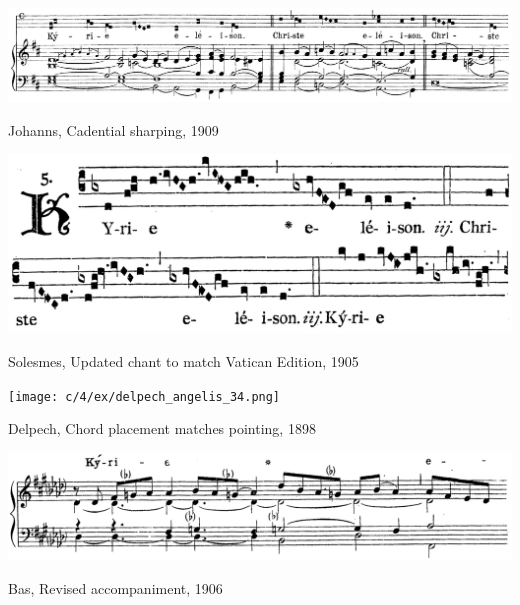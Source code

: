 \begin{landscape}

  \vspace*{\fill}

  \begin{example}
    \centering
    \includegraphics[width=.9\linewidth]{c/4/ex/johanns_50.png}
    \caption{Johanns, Cadential sharping, 1909}
    \label{mus:johanns_50}
  \end{example}

  \vspace*{\fill}

\end{landscape}

\vspace*{\fill}

\begin{example}
  \centering
  \includegraphics[width=.8\linewidth]{c/4/ex/solesmes_vatican_28star.png}
  \caption{Solesmes, Updated chant to match Vatican Edition, 1905}
  \label{mus:solesmes_vatican_28star}
\end{example}

\vspace*{\fill}

\begin{example}
  \centering
  \texttt{[image: c/4/ex/delpech\_angelis\_34.png]}
  \caption{Delpech, Chord placement matches pointing, 1898}
  \label{mus:delpech_angelis_34}
\end{example}

\vspace*{\fill}

\begin{landscape}

  \vspace*{\fill}

  \begin{example}
    \centering
    \includegraphics[width=.8\linewidth]{c/4/ex/bas_angelis_kyriale_40.png}
    \caption{Bas, Revised accompaniment, 1906}
    \label{mus:bas_angelis_kyriale_40}
  \end{example}

  \vspace*{\fill}

\end{landscape}

